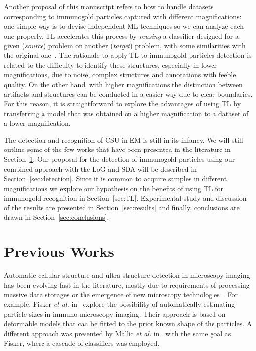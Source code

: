 \documentclass[a4paper,11pt]{article}
\newcommand{\1}{\mathbbm{1}}
\newcommand{\etal}{\emph{et al.} }
\newcommand{\sref}[1]{Section~\ref{#1}}
\theoremstyle{plain}
\begin{document}
Another proposal of this manuscript refers to how to handle datasets corresponding to immunogold particles captured with different magnifications: one simple way is to devise independent \ac{ML} techniques so we can analyze each one properly. \ac{TL} accelerates this process by \emph{reusing} a classifier designed for a given (\emph{source}) problem on another (\emph{target}) problem, with some similarities with the original one~\cite{RGamelasSousaIWANN2015}. The rationale to apply TL to immunogold particles detection is related to the difficulty to identify these structures, especially in lower magnifications, due to noise, complex structures and annotations with feeble quality. On the other hand, with higher magnifications the distinction between artifacts and structures can be conducted in a easier way due to clear boundaries.  For this reason, it is straightforward to explore the advantages of using TL by transferring a model that was obtained on a higher magnification to a dataset of a lower magnification.


The detection and recognition of \ac{CSU} in \ac{EM} is still in its infancy. We will still outline some of the few works that have been presented in the literature in \sref{sec:prevwork}. Our proposal for the detection of immunogold particles using our combined approach with the \ac{LoG} and \ac{SDA} will be described in \sref{sec:detection}. Since it is common to acquire samples in different magnifications we explore our hypothesis on the benefits of using \ac{TL} for immunogold recognition in \sref{sec:TL}. Experimental study and discussion of the results are presented in \sref{sec:results} and finally, conclusions are drawn in \sref{sec:conclusions}.


\section{Previous Works}
\label{sec:prevwork}
Automatic cellular structure and ultra-structure detection in microscopy imaging has been evolving fast in the literature, mostly due to requirements of processing massive data storages or the emergence of new microscopy technologies~\cite{knott2013}. For example, Fisker \etal in~\cite{fisker2000estimation} explore the possibility of automatically estimating particle sizes in immuno-microscopy imaging. Their approach is based on deformable models that can be fitted to the prior known shape of the particles. A different approach was presented by Mallic \etal in~\cite{mallick2004detecting} with the same goal as Fisker, where a cascade of classifiers was employed.
\end{document}
